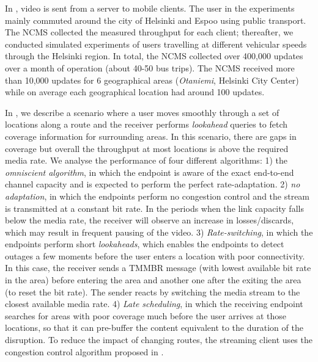 In , video is sent from a server to mobile clients. The user
in the experiments mainly commuted around the city of Helsinki and Espoo using
public transport. The NCMS collected the measured throughput for each client;
thereafter, we conducted simulated experiments of users travelling at different
vehicular speeds through the Helsinki region. In total, the NCMS collected
over 400,000 updates over a month of operation (about 40-50 bus trips). The
NCMS received more than 10,000 updates for 6 geographical areas
(\emph{Otaniemi}, Helsinki City Center) while on average each geographical
location had around 100 updates.

In , we describe a scenario where a user moves smoothly
through a set of locations along a route and the receiver performs
\emph{lookahead} queries to fetch coverage information for surrounding areas.
In this scenario, there are gaps in coverage but overall the throughput at
most locations is above the required media rate. We analyse the performance of
four different algorithms: 1) the \emph{omniscient algorithm}, in which the
endpoint is aware of the exact end-to-end channel capacity and is expected to
perform the perfect rate-adaptation. 2) \emph{no adaptation}, in which the endpoints
perform no congestion control and the stream is transmitted at a constant bit
rate. In the periods when the link capacity falls below the media rate, the 
receiver will observe an increase in losses/discards, which may result in 
frequent pausing of the video. 3) \emph{Rate-switching}, in which the endpoints perform short
\emph{lookaheads}, which enables the endpoints to detect outages a few moments
before the user enters a location with poor connectivity. In this case, the
receiver sends a TMMBR message (with lowest available bit rate in the area)
before entering the area and another one after the exiting the area (to reset
the bit rate). The sender reacts by switching the media stream to the closest
available media rate. 4) \emph{Late scheduling}, in which the receiving endpoint
searches for areas with poor coverage much before the user arrives at those
locations, so that it can pre-buffer the content equivalent to the duration of
the disruption. To reduce the impact of changing routes, the streaming client
uses the congestion control algorithm proposed in .

